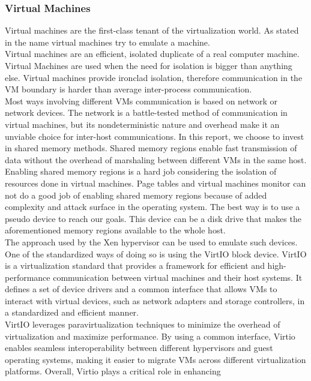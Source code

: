 \documentclass[a4paper, 11pt, twocolumn]{article}
\theoremstyle{nonumberplain}
\begin{document}
\subsubsection{Virtual Machines}
Virtual machines are the first-class tenant of the virtualization world.
As stated in the name virtual machines try to emulate a machine. \\
Virtual machines are an efficient, isolated duplicate of a real computer
machine. Virtual Machines are used when the need for isolation is bigger than
anything else. Virtual machines provide ironclad isolation, therefore
communication in the VM boundary is harder than average inter-process
communication. \\
Most ways involving different VMs communication is based on network or
network devices. The network is a battle-tested method of communication in virtual
machines, but its nondeterministic nature and overhead make it an unviable choice 
for inter-host communications. In this report, we choose to invest in shared
memory methods. Shared memory regions enable fast transmission of data without
the overhead of marshaling between different VMs in the same host. \\
Enabling shared memory regions is a hard job considering the isolation of
resources done in virtual machines. Page tables and virtual machines
monitor can not do a good job of enabling shared memory regions because of
added complexity and attack surface in the operating system. The best way is
to use a pseudo device to reach our goals. This device can be a disk drive
that makes the aforementioned memory regions available to the whole host. \\
The approach used by the Xen hypervisor can be used to emulate such devices.
One of the standardized ways of doing so is using the VirtIO block device.
VirtIO is a virtualization standard that provides a framework for efficient
and high-performance communication between virtual machines and
their host systems. It defines a set of device drivers and a common interface
that allows VMs to interact with virtual devices, such as network adapters
and storage controllers, in a standardized and efficient manner. \\
VirtIO leverages paravirtualization techniques to minimize the overhead
of virtualization and maximize performance. By using a common interface,
Virtio enables seamless interoperability between different hypervisors and
guest operating systems, making it easier to migrate VMs across different
virtualization platforms. Overall, Virtio plays a critical role in enhancing
\end{document}
